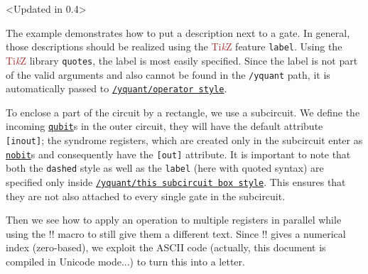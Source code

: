 \documentclass{scrartcl}
\makeatletter
\newenvironment{codeexample*}{%
   \VerbatimEnvironment%
   \let\FVB@VerbatimOut\minted@FVB@VerbatimOut
   \let\FVE@VerbatimOut\minted@FVE@VerbatimOut
   \minted@configlang{tex}%
   \minted@fvset
   \begin{VerbatimOut}[codes={\catcode`\^^I=12},firstline,lastline]{\minted@jobname.pyg}%
}{
   \end{VerbatimOut}%
   \minted@langlinenoson%
   \begin{adjustbox}{center}
       \minted@jobname.pyg %
   \end{adjustbox}\nopagebreak
   \minted@pygmentize{\minted@lang}%
   \minted@langlinenosoff%
   \par%
}
\def\TikZ{\textcolor{brown}{Ti\textit kZ}}
\def\gate#1{\hyperref[gate:#1]{\texttt{#1}}}
\def\style#1{\hyperref[style:#1]{\texttt{#1}}}
\makeatother
\begin{document}
            \begin{example}<Updated in 0.4>
               \begin{codeexample*}
               \end{codeexample*}
               The example demonstrates how to put a description next to a gate.
               In general, those descriptions should be realized using the \TikZ{} feature \texttt{label}.
               Using the \TikZ{} library \texttt{quotes}, the label is most easily specified.
               Since the label is not part of the valid arguments and also cannot be found in the \texttt{/yquant} path, it is automatically passed to \style{/yquant/operator style}.

               To enclose a part of the circuit by a rectangle, we use a subcircuit.
               We define the incoming \gate{qubit}s in the outer circuit, they will have the default attribute \texttt{[inout]}; the syndrome registers, which are created only in the subcircuit enter as \gate{nobit}s and consequently have the \texttt{[out]} attribute.
               It is important to note that both the \texttt{dashed} style as well as the \texttt{label} (here with quoted syntax) are specified only inside \style{/yquant/this subcircuit box style}.
               This ensures that they are not also attached to every single gate in the subcircuit.

               Then we see how to apply an operation to multiple registers in parallel while using the \tex!\idx! macro to still give them a different text.
               Since \tex!\idx! gives a numerical index (zero\hyp based), we exploit the ASCII code (actually, this document is compiled in Unicode mode...) to turn this into a letter.


\end{example}
\end{document}
